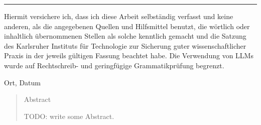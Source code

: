 \documentclass[12pt,a4paper,twoside]{scrartcl}
\numberwithin{equation}{section}
\begin{document}

\vspace*{0pt}\vfill

\hrule\medskip

Hiermit versichere ich, dass ich diese Arbeit selbständig verfasst und keine anderen, als die angegebenen Quellen und Hilfsmittel benutzt, die wörtlich oder inhaltlich übernommenen Stellen als solche kenntlich gemacht und die Satzung des Karlsruher Instituts für Technologie zur Sicherung guter wissenschaftlicher Praxis in der jeweils gültigen Fassung beachtet habe. Die Verwendung von LLMs wurde auf Rechtschreib- und geringfügige Grammatikprüfung begrenzt.

\bigskip

\noindent
Ort, Datum


\vspace*{5cm}

\clearpage


\vspace*{0pt}\vfill

%
%
%

\begin{abstract}
\centerline{Abstract}
  TODO: write some Abstract.
\end{abstract}

\vfill\vfill\vfill
\clearpage


% 
% 
% 


\pagestyle{normal}
\renewcommand\sectionmark[1]{\markboth{\thesection\quad\MakeUppercase{#1}}{\thesection\quad\MakeUppercase{#1}}}
\renewcommand\subsectionmark[1]{\markright{\thesubsection\quad\MakeUppercase{#1}}}
\end{document}
